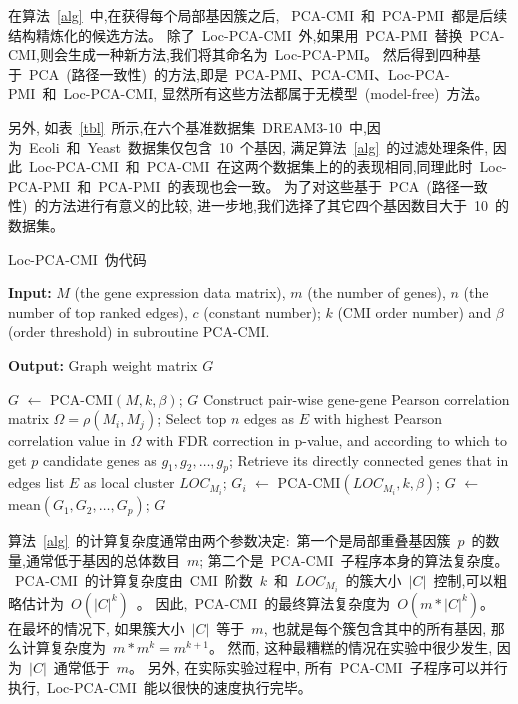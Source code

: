 在算法~\ref{alg}~中,在获得每个局部基因簇之后,
~PCA-CMI~和~PCA-PMI~都是后续结构精炼化的候选方法。
除了~Loc-PCA-CMI~外,如果用~PCA-PMI~替换~PCA-CMI,则会生成一种新方法,我们将其命名为~Loc-PCA-PMI。
然后得到四种基于~PCA~(路径一致性)~的方法,即是~PCA-PMI、PCA-CMI、Loc-PCA-PMI~和~Loc-PCA-CMI,
显然所有这些方法都属于无模型~(model-free)~方法。

另外, 如表~\ref{tbl}~所示,在六个基准数据集~DREAM3-10~中,因为~Ecoli~和~Yeast~数据集仅包含~10~个基因,
满足算法~\ref{alg}~的过滤处理条件,
因此~Loc-PCA-CMI~和~PCA-CMI~在这两个数据集上的的表现相同,同理此时~Loc-PCA-PMI~和~PCA-PMI~的表现也会一致。
为了对这些基于~PCA~(路径一致性)~的方法进行有意义的比较,
进一步地,我们选择了其它四个基因数目大于~10~的数据集。

\begin{algorithm}[!htbp]
    \caption{Loc-PCA-CMI~伪代码} %
    \label{alg}
    {\bf Input:} %
    $M$ (the gene expression data matrix), $m$ (the number of genes), $n$ (the number of top ranked edges), $c$ (constant number); $k$ (CMI order number) and $\beta$ (order threshold) in subroutine PCA-CMI.
    
    {\bf Output:} %
    Graph weight matrix $G$ 
    \begin{algorithmic}[1]
    \State $G$ $\leftarrow$ PCA-CMI$(M, k, \beta)$;
    \State \Return $G$
    \Else
    \State Construct pair-wise gene-gene Pearson correlation matrix $\Omega = \rho(M_i, M_j)$;
    \State Select top $n$ edges as $E$ with highest Pearson correlation value in $\Omega$ with FDR correction in p-value, and according to which to get 
    $p$ candidate genes as $g_1,g_2,\ldots,g_{p}$;
      \State Retrieve its directly connected genes that in edges list $E$ as local cluster $LOC_{M_i}$;
    \EndFor
      \State $G_{i}$ $\leftarrow$ PCA-CMI$(LOC_{M_i}, k, \beta)$;
    \EndFor
    \State $G$ $\leftarrow$ mean$(G_{1},G_{2},\ldots,G_{p})$;
    \State \Return $G$
    \EndIf
    \end{algorithmic}
\end{algorithm}

算法~\ref{alg}~的计算复杂度通常由两个参数决定:~第一个是局部重叠基因簇~$p$~的数量,通常低于基因的总体数目~$m$; 第二个是~PCA-CMI~子程序本身的算法复杂度。
~PCA-CMI~的计算复杂度由~CMI~阶数~$k$~和~$LOC_{M_i}$~的簇大小~$|C|$~控制,可以粗略估计为~$O(|C|^k)$~。
因此,~PCA-CMI~的最终算法复杂度为~$O(m *|C|^k)$。
在最坏的情况下, 如果簇大小~$|C|$~等于~$m$, 也就是每个簇包含其中的所有基因, 那么计算复杂度为~$m*m^k = m^{k+1}$。 
然而, 这种最糟糕的情况在实验中很少发生, 因为~$|C|$~通常低于~$m$。
另外, 在实际实验过程中, 所有~PCA-CMI~子程序可以并行执行,~Loc-PCA-CMI~能以很快的速度执行完毕。

